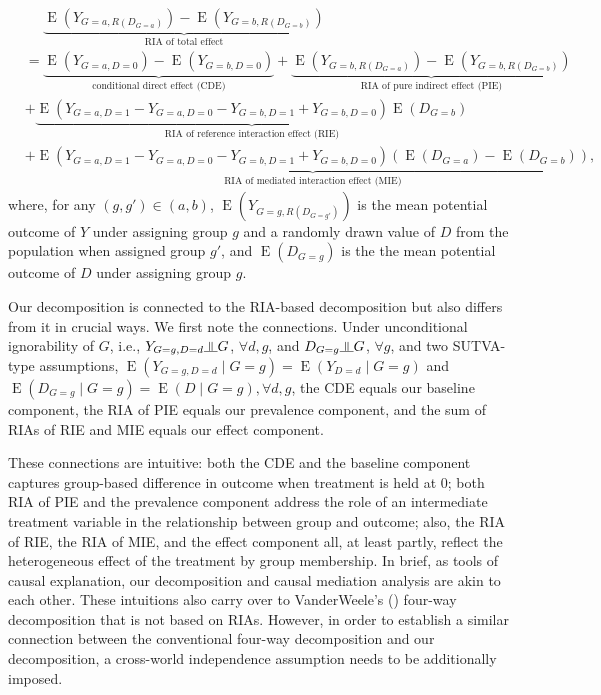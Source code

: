 \documentclass[12pt,a4paper]{article}
\newcommand{\indep}{\rotatebox[origin=c]{90}{$\models$}}  %
\newcommand{\E}{\operatorname{E}}
\begin{document}
\begin{align*}
    &\phantom{{}={}} \underbrace{\E \left(Y_{G=a, R(D_{G=a})} \right)-\E \left(Y_{G=b, R(D_{G=b})} \right)}_{\text{RIA of total effect}} \\
    &=
    \underbrace{\E(Y_{G=a, D=0})-\E(Y_{G=b, D=0})}_{\text{conditional direct effect (CDE)}} +
    \underbrace{\E \left(Y_{G=b, R(D_{G=a})} \right)-\E \left(Y_{G=b, R(D_{G=b})} \right)}_{\text{RIA of pure indirect effect (PIE)}} \\
    & + \underbrace{\E(Y_{G=a, D=1}-Y_{G=a, D=0} - Y_{G=b, D=1} + Y_{G=b, D=0}) \E(D_{G=b})}_{\text{RIA of reference interaction effect (RIE)}} \\
    & + \underbrace{\E(Y_{G=a, D=1}-Y_{G=a, D=0} - Y_{G=b, D=1} + Y_{G=b, D=0}) \left(\E(D_{G=a})-\E(D_{G=b})\right)}_{\text{RIA of mediated interaction effect (MIE)}}, 
\end{align*}
where, for any $(g, g') \in (a,b)$, $\E \left(Y_{G=g, R(D_{G=g'})} \right)$ is the mean potential outcome of $Y$ under assigning group $g$ and a randomly drawn value of $D$ from the population when assigned group $g'$, and $\E(D_{G=g})$ is the the mean potential outcome of $D$ under assigning group $g$.

Our decomposition is connected to the RIA-based decomposition but also differs from it in crucial ways. We first note the connections. 
Under unconditional ignorability of $G$, i.e., $Y_{G=g,D=d} \indep G$, $\forall d,g$, and $D_{G=g} \indep G$, $\forall g$, and two SUTVA-type assumptions, $\E(Y_{G=g,D=d} \mid  G=g)=\E(Y_{D=d} \mid  G=g)$ and $\E(D_{G=g} \mid  G=g)=\E(D \mid  G=g), \forall d,g$, the CDE equals our baseline component, the RIA of PIE equals our prevalence component, and the sum of RIAs of RIE and MIE equals our effect component. 

These connections are intuitive: both the CDE and the baseline component captures group-based difference in outcome when treatment is held at $0$; both RIA of PIE and the prevalence component address the role of an intermediate treatment variable in the relationship between group and outcome; also, the RIA of RIE, the RIA of MIE, and the effect component all, at least partly, reflect the heterogeneous effect of the treatment by group membership. In brief, as tools of causal explanation, our decomposition and causal mediation analysis are akin to each other. These intuitions also carry over to VanderWeele's (\citeyear{vanderweele_unification_2014})  four-way decomposition that is not based on RIAs. However, in order to establish a similar connection between the conventional  four-way decomposition and our decomposition, a cross-world independence assumption needs to be additionally imposed.
\end{document}
